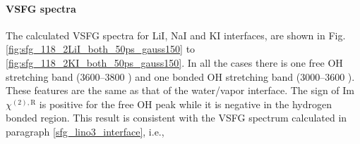\paragraph{VSFG spectra}
The calculated VSFG spectra for LiI, NaI and KI interfaces, are shown in Fig.\thinspace\ref{fig:sfg_118_2LiI_both_50ps_gauss150} to \ref{fig:sfg_118_2KI_both_50ps_gauss150}. 
In all the cases there is one free OH stretching band (3600--3800 \centimeter) and one bonded OH stretching band (3000--3600 \centimeter).
These features are the same as that of the water/vapor interface.
The sign of Im$\chi^{(2),\text{R}}$ is positive for the free OH peak while it is negative in the hydrogen bonded region. %
This result is consistent with the VSFG spectrum calculated in paragraph \ref{sfg_lino3_interface}, i.e., 

